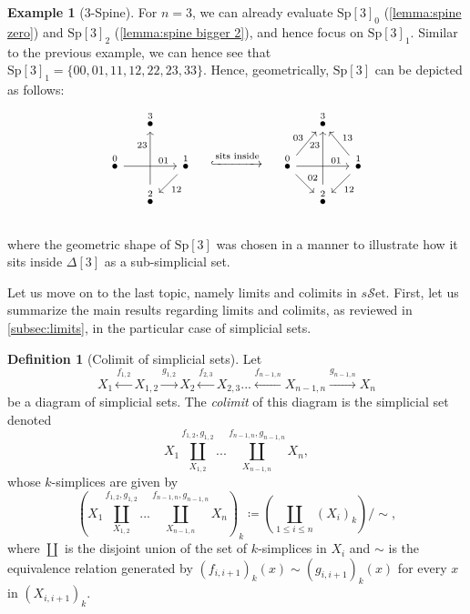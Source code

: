 \documentclass[11pt, a4paper]{amsart}
\newcommand{\sSet}{s\mathscr{S}\mathrm{et}}
\newcommand{\Sp}{\mathrm{Sp}}
\theoremstyle{definition}
\newtheorem{definition}[equation]{Definition}
\newtheorem{example}[equation]{Example}
\theoremstyle{remark}
\numberwithin{equation}{section}
\begin{document}
\begin{example}[3-Spine]
 For $n = 3$, we can already evaluate $\Sp[3]_0$ (\cref{lemma:spine zero}) and $\Sp[3]_2$ (\cref{lemma:spine bigger 2}), and hence focus on $\Sp[3]_1$. Similar to the previous example, we can hence see that $\Sp[3]_1 = \{00,01,11,12,22,23,33\}$. Hence, geometrically, $\Sp[3]$ can be depicted as follows:
  \[ 
  \begin{tikzcd}[row sep=0.5cm, column sep=0.5cm]
    & \overset{3}{\bullet}& \\
    \overset{0}{\bullet} \arrow[rr, "01" near end] &   & \overset{1}{\bullet} \arrow[dl, "12"]  \\[-.2cm]
     & \overset{2}{\bullet} \arrow[uu, "23" near end] & \\
  \end{tikzcd}
  \quad 
  \xhookrightarrow[]{ \text{sits inside}} 
  \quad
  \begin{tikzcd}[row sep=0.5cm, column sep=0.5cm]
    & \overset{3}{\bullet}& \\
    \overset{0}{\bullet} \arrow[ur, "03"] \arrow[dr, "02"] \arrow[rr, "01" near end] &   & \overset{1}{\bullet} \arrow[dl, "12"] \arrow[ul, "13"'] \\[-.2cm]
     & \overset{2}{\bullet} \arrow[uu, "23" near end] & \\
  \end{tikzcd}
  \]
  where the geometric shape of $\Sp[3]$ was chosen in a manner to illustrate how it sits inside $\Delta[3]$ as a sub-simplicial set.
\end{example}

Let us move on to the last topic, namely limits and colimits in $\sSet$. First, let us summarize the main results regarding limits and colimits, as reviewed in \cref{subsec:limits}, in the particular case of simplicial sets.

\begin{definition}[Colimit of simplicial sets] \label{def:colimit sset}
  Let 
  \[X_1 \xleftarrow{f_{1,2}} X_{1,2} \xrightarrow{g_{1,2}} X_2 \xleftarrow{f_{2,3}} X_{2,3} ... \xleftarrow{f_{n-1,n}} X_{n-1,n}\xrightarrow{g_{n-1,n}}  X_n \]
   be a diagram of simplicial sets. The \emph{colimit} of this diagram is the simplicial set denoted 
   \[X_1 \coprod_{X_{1,2}}^{f_{1,2},g_{1,2}} ... \coprod_{X_{n-1,n}}^{f_{n-1,n},g_{n-1,n}} X_n,\] 
   whose $k$-simplices are given by
  \[(X_1 \coprod_{X_{1,2}}^{f_{1,2},g_{1,2}} ... \coprod_{X_{n-1,n}}^{f_{n-1,n},g_{n-1,n}} X_n)_k \coloneq (\coprod_{1 \leq i \leq n}(X_i)_k) / \sim,\]
  where $\coprod$ is the disjoint union of the set of $k$-simplices in $X_i$ and  $\sim$ is the equivalence relation generated by $(f_{i,i+1})_k(x) \sim (g_{i,i+1})_k(x)$ for every $x$ in $(X_{i,i+1})_k$.
\end{definition}
\end{document}
